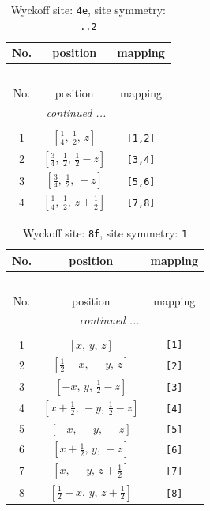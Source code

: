\documentclass[fleqn,8pt]{jsarticle}
\begin{document}
\renewcommand{\arraystretch}{1.2}
\begin{longtable}{ccc}
\caption{Wyckoff site: {\tt 4e}, site symmetry: {\tt ..2}}
 \\
 \hline \hline
No. & position & mapping \\ \hline \endfirsthead

\multicolumn{2}{l}{\tablename\ \thetable{}} \\
 \hline \hline
No. & position & mapping \\ \hline \endhead

 \hline \hline
\multicolumn{2}{r}{\footnotesize\it continued ...} \\ \endfoot

 \hline \hline
\multicolumn{2}{r}{} \\ \endlastfoot

1 & $\left[ \frac{1}{4},\, \frac{1}{2},\, z \right]$ & {\tt [1,2]} \\ \hline
2 & $\left[ \frac{3}{4},\, \frac{1}{2},\, \frac{1}{2} - z \right]$ & {\tt [3,4]} \\ \hline
3 & $\left[ \frac{3}{4},\, \frac{1}{2},\, - z \right]$ & {\tt [5,6]} \\ \hline
4 & $\left[ \frac{1}{4},\, \frac{1}{2},\, z + \frac{1}{2} \right]$ & {\tt [7,8]} \\
\end{longtable}
\renewcommand{\arraystretch}{1.2}
\begin{longtable}{ccc}
\caption{Wyckoff site: {\tt 8f}, site symmetry: {\tt 1}}
 \\
 \hline \hline
No. & position & mapping \\ \hline \endfirsthead

\multicolumn{2}{l}{\tablename\ \thetable{}} \\
 \hline \hline
No. & position & mapping \\ \hline \endhead

 \hline \hline
\multicolumn{2}{r}{\footnotesize\it continued ...} \\ \endfoot

 \hline \hline
\multicolumn{2}{r}{} \\ \endlastfoot

1 & $\left[ x,\, y,\, z \right]$ & {\tt [1]} \\ \hline
2 & $\left[ \frac{1}{2} - x,\, - y,\, z \right]$ & {\tt [2]} \\ \hline
3 & $\left[ - x,\, y,\, \frac{1}{2} - z \right]$ & {\tt [3]} \\ \hline
4 & $\left[ x + \frac{1}{2},\, - y,\, \frac{1}{2} - z \right]$ & {\tt [4]} \\ \hline
5 & $\left[ - x,\, - y,\, - z \right]$ & {\tt [5]} \\ \hline
6 & $\left[ x + \frac{1}{2},\, y,\, - z \right]$ & {\tt [6]} \\ \hline
7 & $\left[ x,\, - y,\, z + \frac{1}{2} \right]$ & {\tt [7]} \\ \hline
8 & $\left[ \frac{1}{2} - x,\, y,\, z + \frac{1}{2} \right]$ & {\tt [8]} \\
\end{longtable}
\end{document}
